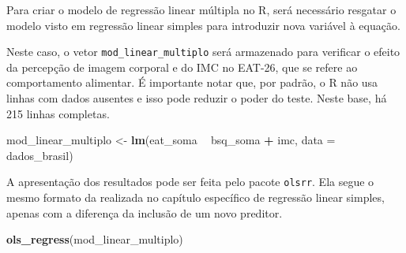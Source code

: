 \documentclass[
]{book}
\newenvironment{Shaded}{\begin{snugshade}}{\end{snugshade}}
\newcommand{\DataTypeTok}[1]{\textcolor[rgb]{0.13,0.29,0.53}{#1}}
\newcommand{\KeywordTok}[1]{\textcolor[rgb]{0.13,0.29,0.53}{\textbf{#1}}}
\newcommand{\NormalTok}[1]{#1}
\newcommand{\OperatorTok}[1]{\textcolor[rgb]{0.81,0.36,0.00}{\textbf{#1}}}
\newcommand{\StringTok}[1]{\textcolor[rgb]{0.31,0.60,0.02}{#1}}
\begin{document}
Para criar o modelo de regressão linear múltipla no R, será necessário resgatar o modelo visto em regressão linear simples para introduzir nova variável à equação.

Neste caso, o vetor \texttt{mod\_linear\_multiplo} será armazenado para verificar o efeito da percepção de imagem corporal e do IMC no EAT-26, que se refere ao comportamento alimentar. É importante notar que, por padrão, o R não usa linhas com dados ausentes e isso pode reduzir o poder do teste. Neste base, há 215 linhas completas.

\begin{Shaded}
\begin{Highlighting}[]
\NormalTok{mod_linear_multiplo <-}\StringTok{ }\KeywordTok{lm}\NormalTok{(eat_soma }\OperatorTok{~}\StringTok{ }\NormalTok{bsq_soma }\OperatorTok{+}\StringTok{ }\NormalTok{imc, }\DataTypeTok{data =}\NormalTok{ dados_brasil)}
\end{Highlighting}
\end{Shaded}

A apresentação dos resultados pode ser feita pelo pacote \texttt{olsrr}. Ela segue o mesmo formato da realizada no capítulo específico de regressão linear simples, apenas com a diferença da inclusão de um novo preditor.

\begin{Shaded}
\begin{Highlighting}[]
\KeywordTok{ols_regress}\NormalTok{(mod_linear_multiplo)}
\end{Highlighting}
\end{Shaded}
\end{document}
